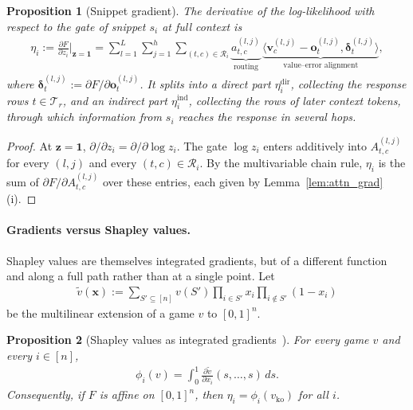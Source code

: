 \documentclass{article}
\newtheorem{proposition}{Proposition}
\begin{document}
\begin{proposition}[Snippet gradient]\label{prop:snippet_gradient}
The derivative of the log-likelihood with respect to the gate of snippet $s_i$ at full context is
\begin{align}\label{eq:snippet_gradient}
    \eta_i := \frac{\partial F}{\partial z_i}\Big|_{\mathbf{z} = \mathbf{1}} = \sum_{l=1}^{L} \sum_{j=1}^{h} \sum_{(t,c) \in \mathcal{R}_i} \underbrace{a^{(l,j)}_{t,c}}_{\text{routing}} \, \underbrace{\big\langle \mathbf{v}^{(l,j)}_c - \mathbf{o}^{(l,j)}_t, \boldsymbol{\delta}^{(l,j)}_t \big\rangle}_{\text{value--error alignment}},
\end{align}
where $\boldsymbol{\delta}^{(l,j)}_t := \partial F / \partial \mathbf{o}^{(l,j)}_t$. It splits into a \emph{direct} part $\eta_i^{\text{dir}}$, collecting the response rows $t \in \mathcal{T}_r$, and an \emph{indirect} part $\eta_i^{\text{ind}}$, collecting the rows of later context tokens, through which information from $s_i$ reaches the response in several hops.
\end{proposition}

\begin{proof}
At $\mathbf{z} = \mathbf{1}$, $\partial / \partial z_i = \partial / \partial \log z_i$. The gate $\log z_i$ enters additively into $A^{(l,j)}_{t,c}$ for every $(l,j)$ and every $(t,c) \in \mathcal{R}_i$. By the multivariable chain rule, $\eta_i$ is the sum of $\partial F / \partial A^{(l,j)}_{t,c}$ over these entries, each given by Lemma~\ref{lem:attn_grad}(i).
\end{proof}

\paragraph{Gradients versus Shapley values.}
Shapley values are themselves integrated gradients, but of a different function and along a full path rather than at a single point. Let 
\begin{align}
    \tilde{v}(\mathbf{x}) := \sum_{S' \subseteq [n]} v(S') \prod_{i \in S'} x_i \prod_{i \notin S'} (1 - x_i)
\end{align} be the multilinear extension of a game $v$ to $[0,1]^n$.

\begin{proposition}[Shapley values as integrated gradients~\cite{owen1972multilinear}]\label{prop:owen}
For every game $v$ and every $i \in [n]$,
\begin{align}
    \phi_i(v) = \int_0^1 \frac{\partial \tilde{v}}{\partial x_i}(s, \dots, s)\, ds.
\end{align}
Consequently, if $F$ is affine on $[0,1]^n$, then $\eta_i = \phi_i(v_{\text{ko}})$ for all $i$.
\end{proposition}
\end{document}
